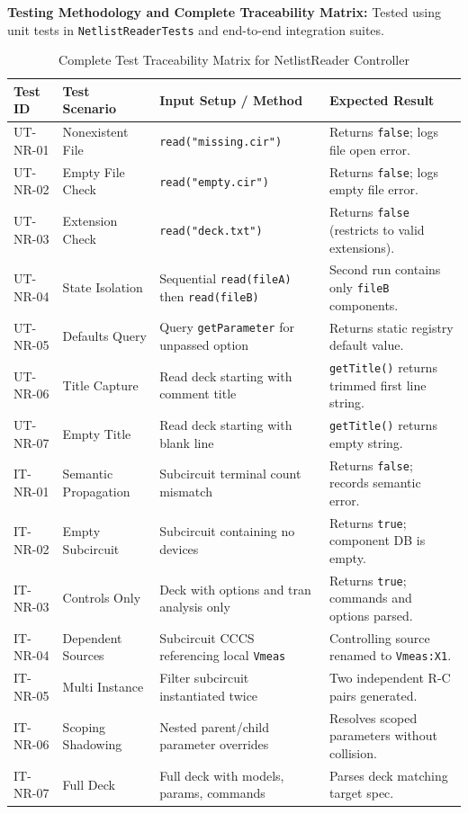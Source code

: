 \textbf{Testing Methodology and Complete Traceability Matrix:} Tested using unit tests in \texttt{NetlistReaderTests} and end-to-end integration suites.

\begin{table}[H]
\centering
\small
\begin{tabular}{|l|l|p{4.5cm}|p{4.5cm}|}
\hline
\textbf{Test ID} & \textbf{Test Scenario} & \textbf{Input Setup / Method} & \textbf{Expected Result} \\
\hline
UT-NR-01 & Nonexistent File & \texttt{read("missing.cir")} & Returns \texttt{false}; logs file open error. \\
\hline
UT-NR-02 & Empty File Check & \texttt{read("empty.cir")} & Returns \texttt{false}; logs empty file error. \\
\hline
UT-NR-03 & Extension Check & \texttt{read("deck.txt")} & Returns \texttt{false} (restricts to valid extensions). \\
\hline
UT-NR-04 & State Isolation & Sequential \texttt{read(fileA)} then \texttt{read(fileB)} & Second run contains only \texttt{fileB} components. \\
\hline
UT-NR-05 & Defaults Query & Query \texttt{getParameter} for unpassed option & Returns static registry default value. \\
\hline
UT-NR-06 & Title Capture & Read deck starting with comment title & \texttt{getTitle()} returns trimmed first line string. \\
\hline
UT-NR-07 & Empty Title & Read deck starting with blank line & \texttt{getTitle()} returns empty string. \\
\hline
IT-NR-01 & Semantic Propagation & Subcircuit terminal count mismatch & Returns \texttt{false}; records semantic error. \\
\hline
IT-NR-02 & Empty Subcircuit & Subcircuit containing no devices & Returns \texttt{true}; component DB is empty. \\
\hline
IT-NR-03 & Controls Only & Deck with options and tran analysis only & Returns \texttt{true}; commands and options parsed. \\
\hline
IT-NR-04 & Dependent Sources & Subcircuit CCCS referencing local \texttt{Vmeas} & Controlling source renamed to \texttt{Vmeas:X1}. \\
\hline
IT-NR-05 & Multi Instance & Filter subcircuit instantiated twice & Two independent R-C pairs generated. \\
\hline
IT-NR-06 & Scoping Shadowing & Nested parent/child parameter overrides & Resolves scoped parameters without collision. \\
\hline
IT-NR-07 & Full Deck & Full deck with models, params, commands & Parses deck matching target spec. \\
\hline
\end{tabular}
\caption{Complete Test Traceability Matrix for NetlistReader Controller}
\end{table}


